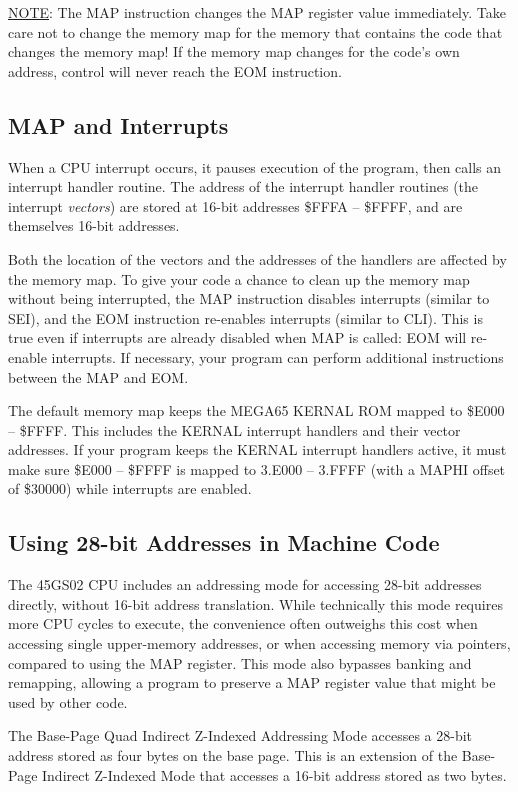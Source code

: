 \underline{NOTE}: The MAP instruction changes the MAP register value immediately. Take care not to change the memory map for the memory that contains the code that changes the memory map! If the memory map changes for the code's own address, control will never reach the EOM instruction.

\subsection{MAP and Interrupts}

When a CPU interrupt occurs, it pauses execution of the program, then calls an interrupt handler routine. The address of the interrupt handler routines (the interrupt {\em vectors}) are stored at 16-bit addresses \$FFFA -- \$FFFF, and are themselves 16-bit addresses.

Both the location of the vectors and the addresses of the handlers are affected by the memory map. To give your code a chance to clean up the memory map without being interrupted, the MAP instruction disables interrupts (similar to SEI), and the EOM instruction re-enables interrupts (similar to CLI). This is true even if interrupts are already disabled when MAP is called: EOM will re-enable interrupts. If necessary, your program can perform additional instructions between the MAP and EOM.

The default memory map keeps the MEGA65 KERNAL ROM mapped to \$E000 -- \$FFFF. This includes the KERNAL interrupt handlers and their vector addresses. If your program keeps the KERNAL interrupt handlers active, it must make sure \$E000 -- \$FFFF is mapped to 3.E000 -- 3.FFFF (with a MAPHI offset of \$30000) while interrupts are enabled.

\subsection{Using 28-bit Addresses in Machine Code}

The 45GS02 CPU includes an addressing mode for accessing 28-bit addresses directly, without 16-bit address translation. While technically this mode requires more CPU cycles to execute, the convenience often outweighs this cost when accessing single upper-memory addresses, or when accessing memory via pointers, compared to using the MAP register. This mode also bypasses banking and remapping, allowing a program to preserve a MAP register value that might be used by other code.

The Base-Page Quad Indirect Z-Indexed Addressing Mode accesses a 28-bit address stored as four bytes on the base page. This is an extension of the Base-Page Indirect Z-Indexed Mode that accesses a 16-bit address stored as two bytes.

